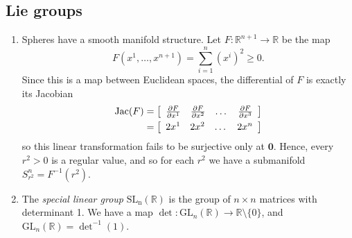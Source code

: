 \subsection{Lie groups}
\begin{xmpl}
  \begin{enumerate}
    \item{
      Spheres have a smooth manifold structure. Let
      $F: \mathbb{R}^{n+1} \to \mathbb{R}$ be the map
      $$
        F(x^1, \dots, x^{n+1})
      = \sum_{i=1}^n (x^i)^2 \geq 0.
      $$
      Since this is a map between Euclidean spaces, the differential
      of $F$ is exactly its Jacobian
      \begin{align*}
         \mathrm{Jac}(F)
      &= \left[\begin{array}{c c c c}
           \frac{\partial F}{\partial x^1} &
           \frac{\partial F}{\partial x^2} &
           \dots &
           \frac{\partial F}{\partial x^3}
         \end{array}\right] \\
      &= \left[\begin{array}{c c c c}
           2x^1 &
           2x^2 &
           \dots &
           2x^n
         \end{array}\right]
      \end{align*}
      so this linear transformation fails to be surjective only at
      $\mathbf{0}$. Hence, every $r^2 > 0$ is a regular value, and so
      for each $r^2$ we have a submanifold $S^n_{r^2} = F^{-1}(r^2)$.
    }
    \item{
      The \emph{special linear group} $\mathrm{SL_n(\mathbb{R})}$ is
      the group of $n \times n$ matrices with determinant 1. We have a
      map
      $\det: \mathrm{GL}_n(\mathbb{R}) \to \mathbb{R} \setminus \{ 0
      \}$, and $\mathrm{GL}_n(\mathbb{R}) = \det^{-1}(1)$.

}
\end{enumerate}
\end{xmpl}
